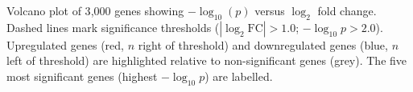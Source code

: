 \caption{Volcano plot of 3{,}000 genes showing $-\log_{10}(p)$ versus $\log_2$ fold change.
Dashed lines mark significance thresholds ($|\log_2\text{FC}|>1.0$; $-\log_{10}p>2.0$).
Upregulated genes (red, $n$ right of threshold) and downregulated genes (blue, $n$ left of threshold) are highlighted relative to non-significant genes (grey).
The five most significant genes (highest $-\log_{10}p$) are labelled.}
